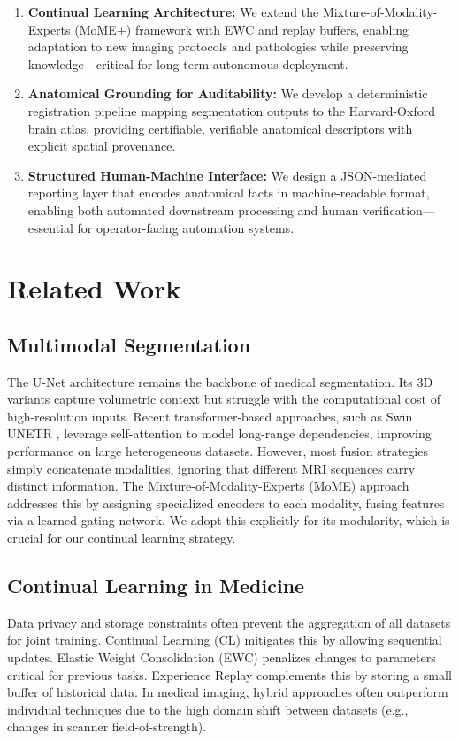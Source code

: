 \documentclass[conference]{IEEEtran}
\begin{document}
\begin{enumerate}
    \item \textbf{Continual Learning Architecture:} We extend the Mixture-of-Modality-Experts (MoME+) framework \cite{zhang2024mome} with EWC and replay buffers, enabling adaptation to new imaging protocols and pathologies while preserving knowledge—critical for long-term autonomous deployment.
    \item \textbf{Anatomical Grounding for Auditability:} We develop a deterministic registration pipeline mapping segmentation outputs to the Harvard-Oxford brain atlas, providing certifiable, verifiable anatomical descriptors with explicit spatial provenance.
    \item \textbf{Structured Human-Machine Interface:} We design a JSON-mediated reporting layer that encodes anatomical facts in machine-readable format, enabling both automated downstream processing and human verification—essential for operator-facing automation systems.
\end{enumerate}

\section{Related Work}

\subsection{Multimodal Segmentation}
The U-Net architecture remains the backbone of medical segmentation. Its 3D variants capture volumetric context but struggle with the computational cost of high-resolution inputs. Recent transformer-based approaches, such as Swin UNETR \cite{hatamizadeh2022swin}, leverage self-attention to model long-range dependencies, improving performance on large heterogeneous datasets. However, most fusion strategies simply concatenate modalities, ignoring that different MRI sequences carry distinct information. The Mixture-of-Modality-Experts (MoME) approach addresses this by assigning specialized encoders to each modality, fusing features via a learned gating network. We adopt this explicitly for its modularity, which is crucial for our continual learning strategy.

\subsection{Continual Learning in Medicine}
Data privacy and storage constraints often prevent the aggregation of all datasets for joint training. Continual Learning (CL) mitigates this by allowing sequential updates. Elastic Weight Consolidation (EWC) \cite{kirkpatrick2017ewc} penalizes changes to parameters critical for previous tasks. Experience Replay \cite{rebuffi2017icarl} complements this by storing a small buffer of historical data. In medical imaging, hybrid approaches often outperform individual techniques due to the high domain shift between datasets (e.g., changes in scanner field-of-strength).
\end{document}
